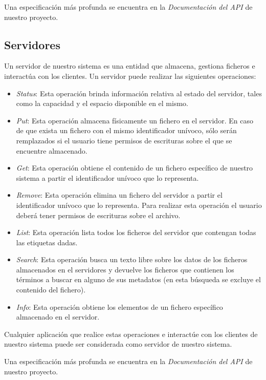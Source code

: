 \documentclass{article}
\begin{document}
Una especificación más profunda se encuentra en la \emph{Documentación del API}
de nuestro proyecto.

\subsection{Servidores}

Un servidor de nuestro sistema es una entidad que almacena, gestiona ficheros
e interactúa con los clientes. Un servidor puede realizar las siguientes
operaciones:

\begin{itemize}
  \item \emph{Status}: Esta operación brinda información relativa al estado del
  servidor, tales como la capacidad y el espacio disponible en el mismo.
  
  \item \emph{Put}: Esta operación almacena físicamente un fichero en el 
  servidor. En caso de que exista un fichero con el mismo identificador
  unívoco, sólo serán remplazados si el usuario tiene permisos de escrituras
  sobre el que se encuentre almacenado.
  
  \item \emph{Get}: Esta operación obtiene el contenido de un fichero específico
  de nuestro sistema a partir el identificador unívoco que lo representa.
  
  \item \emph{Remove}: Esta operación elimina un fichero del servidor a partir
  el identificador unívoco que lo representa. Para realizar esta operación el
  usuario deberá tener permisos de escrituras sobre el archivo.
  
  \item \emph{List}: Esta operación lista todos los ficheros del servidor que
  contengan todas las etiquetas dadas.
  
  \item \emph{Search}: Esta operación busca un texto libre sobre los datos
  de los ficheros almacenados en el servidores y devuelve los ficheros que
  contienen los términos a buscar en alguno de sus metadatos (en esta búsqueda
  se excluye el contenido del fichero).
  
  \item \emph{Info}: Esta operación obtiene los elementos de un fichero
  específico almacenado en el servidor.
\end{itemize}

Cualquier aplicación que realice estas operaciones e interactúe con los
clientes de nuestro sistema puede ser considerada como servidor de nuestro
sistema.

Una especificación más profunda se encuentra en la \emph{Documentación del API}
de nuestro proyecto.
\end{document}
